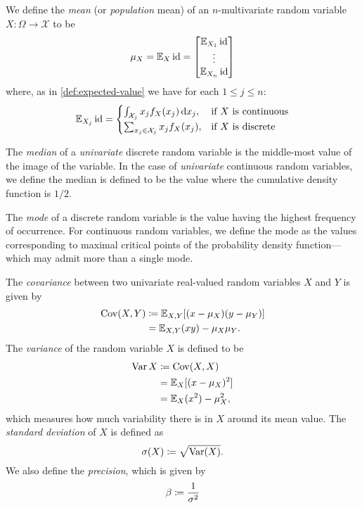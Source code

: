 \begin{definition}
\label{def:mean-of-random-variable}
We define the \emph{mean} (or \emph{population} mean) of an \(n\)-multivariate
random variable \(X: \Omega \to \mathcal{X}\) to be
\[
\mu_X = \operatorname{\mathbb{E}}_X \operatorname{id} =
\begin{bmatrix}
  \operatorname{\mathbb{E}}_{X_1} \operatorname{id} \\
  \vdots \\
  \operatorname{\mathbb{E}}_{X_n} \operatorname{id}
\end{bmatrix}
\]
where, as in \cref{def:expected-value} we have for each \(1 \leq j \leq n\):
\[
\operatorname{\mathbb{E}}_{X_j} \operatorname{id} =
\begin{cases}
  \int_{\mathcal{X}_j} x_j f_X(x_j)\, \mathrm{d} x_j, &\text{if } X \text{ is
                                                   continuous} \\
  \sum_{x_j \in \mathcal{X}_j} x_j f_X(x_j), &\text{if } X \text{ is discrete}
\end{cases}
\]

The \emph{median} of a \emph{univariate} discrete random variable is the
middle-most value of the image of the variable. In the case of \emph{univariate}
continuous random variables, we define the median is defined to be the value
where the cumulative density function is \(1/2\).

The \emph{mode} of a discrete random variable is the value having the highest
frequency of occurrence. For continuous random variables, we define the mode as
the values corresponding to maximal critical points of the probability density
function---which may admit more than a single mode.
\end{definition}

\begin{definition}
\label{def:covariance-univariate}
The \emph{covariance} between two univariate real-valued random variables \(X\)
and \(Y\) is given by
\begin{align*}
  \operatorname{Cov}(X, Y)
  &\coloneq \operatorname{\mathbb{E}}_{X, Y}[(x - \mu_X)(y - \mu_Y)] \\
  &= \operatorname{\mathbb{E}}_{X, Y}(x y) - \mu_X \mu_Y.
\end{align*}
The \emph{variance} of the random variable \(X\) is defined to be
\begin{align*}
\operatorname{Var} X
&\coloneq \operatorname{Cov}(X, X) \\
&= \operatorname{\mathbb{E}}_X[(x - \mu_X)^2] \\
&= \operatorname{\mathbb{E}}_X(x^2) - \mu_X^2,
\end{align*}
which measures how much variability there is in \(X\) around its mean value.
The \emph{standard deviation} of \(X\) is defined as
\[
\operatorname{\sigma}(X) \coloneq \sqrt{\operatorname{Var}(X)}.
\]
We also define the \emph{precision}, which is given by
\[
\operatorname{\beta} \coloneq \frac{1}{\operatorname{\sigma}^2}
\]
\end{definition}

